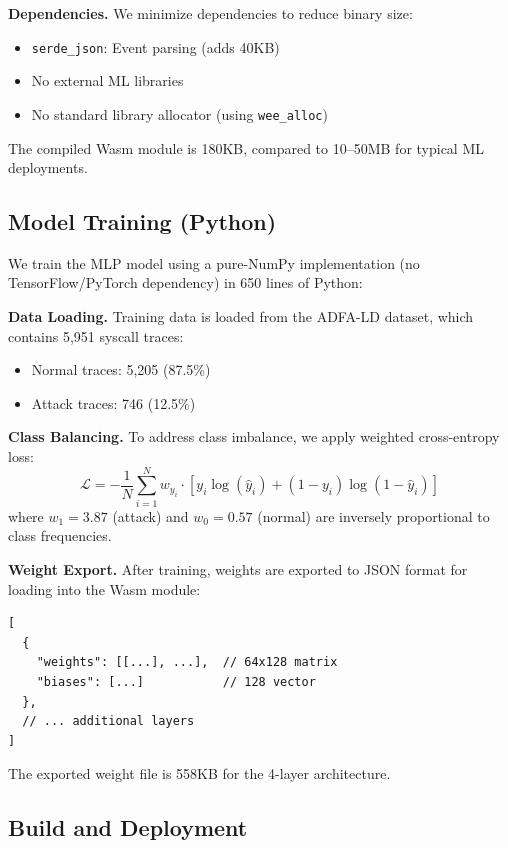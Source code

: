 \textbf{Dependencies.}
We minimize dependencies to reduce binary size:
\begin{itemize}
    \item \texttt{serde\_json}: Event parsing (adds 40KB)
    \item No external ML libraries
    \item No standard library allocator (using \texttt{wee\_alloc})
\end{itemize}

The compiled Wasm module is 180KB, compared to 10--50MB for typical ML deployments.

\subsection{Model Training (Python)}

We train the MLP model using a pure-NumPy implementation (no TensorFlow/PyTorch dependency) in 650 lines of Python:

\textbf{Data Loading.}
Training data is loaded from the ADFA-LD dataset, which contains 5,951 syscall traces:
\begin{itemize}
    \item Normal traces: 5,205 (87.5\%)
    \item Attack traces: 746 (12.5\%)
\end{itemize}

\textbf{Class Balancing.}
To address class imbalance, we apply weighted cross-entropy loss:
\begin{equation}
\mathcal{L} = -\frac{1}{N}\sum_{i=1}^{N} w_{y_i} \cdot [y_i \log(\hat{y}_i) + (1-y_i)\log(1-\hat{y}_i)]
\end{equation}
where $w_1 = 3.87$ (attack) and $w_0 = 0.57$ (normal) are inversely proportional to class frequencies.

\textbf{Weight Export.}
After training, weights are exported to JSON format for loading into the Wasm module:

\begin{lstlisting}[style=rust, caption={Weight file format (JSON).}]
[
  {
    "weights": [[...], ...],  // 64x128 matrix
    "biases": [...]           // 128 vector
  },
  // ... additional layers
]
\end{lstlisting}

The exported weight file is 558KB for the 4-layer architecture.

\subsection{Build and Deployment}

